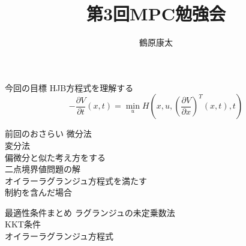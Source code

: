 \documentclass[dvipdfmx,12pt]{beamer}
\title{第3回MPC勉強会}
\author{鶴原康太}
\begin{document}
    \frame{\maketitle}
    
    \begin{frame}{今回の目標}
        \footnotesize
        HJB方程式を理解する
        \begin{equation*}
            -\frac{\partial V}{\partial t}\left(x,t\right) = \min _u H\left(x, u, \left( \frac{\partial V}{\partial x} \right)^T\left(x, t\right), t \right)
        \end{equation*}
        \centering
    \end{frame}

    \begin{frame}{前回のおさらい}
        微分法 \\

        変分法 \\

        偏微分と似た考え方をする \\

        二点境界値問題の解 \\
        オイラーラグランジュ方程式を満たす \\
        制約を含んだ場合 \\
    \end{frame}

    \begin{frame}{最適性条件まとめ}
        \footnotesize
        ラグランジュの未定乗数法\\
        KKT条件\\
        オイラーラグランジュ方程式\\
    \end{frame}
\end{document}
